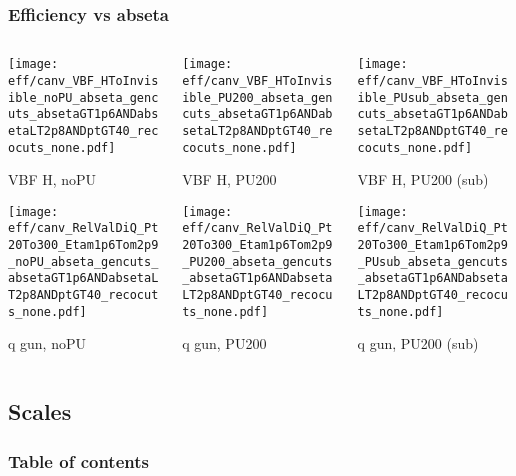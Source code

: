 \documentclass[8pt]{beamer}
\begin{document}
 \begin{frame}
  \frametitle{Efficiency vs abseta}
  
  \begin{columns}
   \begin{column}{0.35\textwidth}
     \texttt{[image: eff/canv\_VBF\_HToInvisible\_noPU\_abseta\_gencuts\_absetaGT1p6ANDabsetaLT2p8ANDptGT40\_recocuts\_none.pdf]}
     
     VBF H, noPU
    
     \texttt{[image: eff/canv\_RelValDiQ\_Pt20To300\_Etam1p6Tom2p9\_noPU\_abseta\_gencuts\_absetaGT1p6ANDabsetaLT2p8ANDptGT40\_recocuts\_none.pdf]}
     
     q gun, noPU
   \end{column}
   \begin{column}{0.35\textwidth}
     \texttt{[image: eff/canv\_VBF\_HToInvisible\_PU200\_abseta\_gencuts\_absetaGT1p6ANDabsetaLT2p8ANDptGT40\_recocuts\_none.pdf]}
     
     VBF H, PU200
    
     \texttt{[image: eff/canv\_RelValDiQ\_Pt20To300\_Etam1p6Tom2p9\_PU200\_abseta\_gencuts\_absetaGT1p6ANDabsetaLT2p8ANDptGT40\_recocuts\_none.pdf]}
     
     q gun, PU200
   \end{column}
   \begin{column}{0.35\textwidth}
     \texttt{[image: eff/canv\_VBF\_HToInvisible\_PUsub\_abseta\_gencuts\_absetaGT1p6ANDabsetaLT2p8ANDptGT40\_recocuts\_none.pdf]}
     
     VBF H, PU200 (sub)
    
     \texttt{[image: eff/canv\_RelValDiQ\_Pt20To300\_Etam1p6Tom2p9\_PUsub\_abseta\_gencuts\_absetaGT1p6ANDabsetaLT2p8ANDptGT40\_recocuts\_none.pdf]}
     
     q gun, PU200 (sub)
   \end{column}
  \end{columns}
 \end{frame}
 
  \subsection{Scales}

\begin{frame}
 \frametitle{Table of contents}
 
\end{frame}
\end{document}
